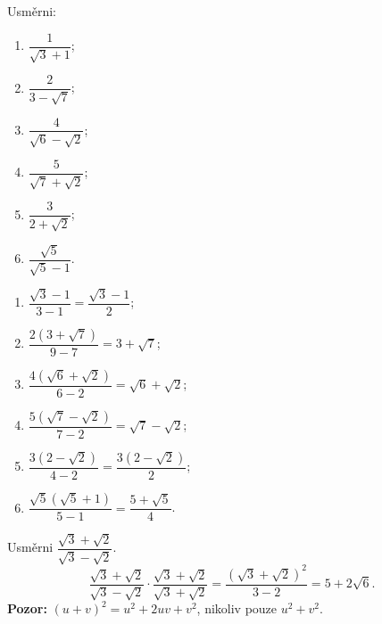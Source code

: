 \documentclass[11pt,a4paper]{article}
\begin{document}
\begin{zadaniReseniBox}[breakable=false,title={Samostatná práce 1: jeden sdružený výraz stačí}]
Usměrni:
\begin{enumerate}[label=\alph*)]
\item $\dfrac1{\sqrt3+1}$;
\item $\dfrac2{3-\sqrt7}$;
\item $\dfrac4{\sqrt6-\sqrt2}$;
\item $\dfrac5{\sqrt7+\sqrt2}$;
\item $\dfrac3{2+\sqrt2}$;
\item $\dfrac{\sqrt5}{\sqrt5-1}$.
\end{enumerate}
\tcblower
\begin{enumerate}[label=\alph*)]
\item $\dfrac{\sqrt3-1}{3-1}=\dfrac{\sqrt3-1}2$;
\item $\dfrac{2(3+\sqrt7)}{9-7}=3+\sqrt7$;
\item $\dfrac{4(\sqrt6+\sqrt2)}{6-2}=\sqrt6+\sqrt2$;
\item $\dfrac{5(\sqrt7-\sqrt2)}{7-2}=\sqrt7-\sqrt2$;
\item $\dfrac{3(2-\sqrt2)}{4-2}=\dfrac{3(2-\sqrt2)}2$;
\item $\dfrac{\sqrt5(\sqrt5+1)}{5-1}=\dfrac{5+\sqrt5}{4}$.
\end{enumerate}
\end{zadaniReseniBox}

\begin{prikladReseniBox}[breakable=false,title={Příklad 2: usměrňování s dvojčlenem v čitateli}]
Usměrni $\dfrac{\sqrt3+\sqrt2}{\sqrt3-\sqrt2}$.
\tcblower
\[
\frac{\sqrt3+\sqrt2}{\sqrt3-\sqrt2}
\cdot\frac{\sqrt3+\sqrt2}{\sqrt3+\sqrt2}
=\frac{(\sqrt3+\sqrt2)^2}{3-2}
=\boxed{5+2\sqrt6}.
\]
\textbf{Pozor:} $(u+v)^2=u^2+2uv+v^2$, nikoliv pouze $u^2+v^2$.
\end{prikladReseniBox}
\end{document}
